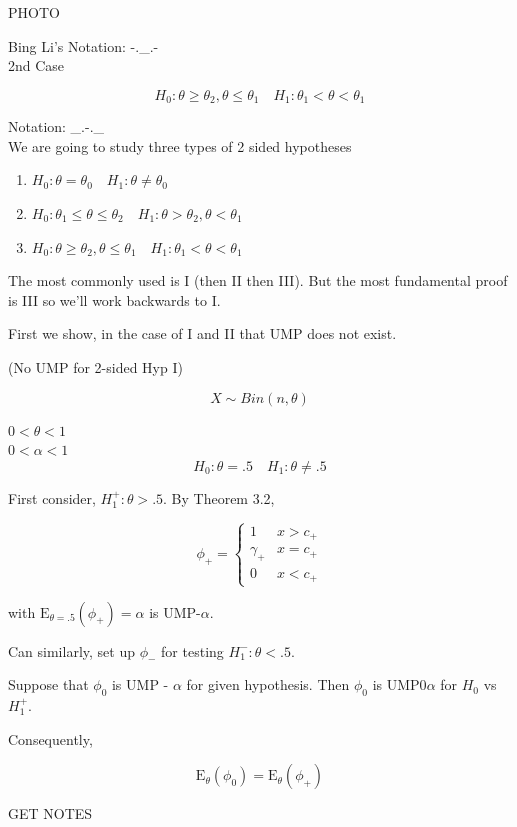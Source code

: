 \documentclass[11pt,fleqn]{book} %
\newcommand{\E}{\mathrm{E}}
\begin{document}
PHOTO

Bing Li's Notation: -.\_.-\\


2nd Case

    	$$ H_0: \theta \geq \theta_2, \theta \leq \theta_1 \quad H_1: \theta_1 < \theta < \theta_1$$

Notation: \_.-.\_ \\



We are going to study three types of 2 sided hypotheses

		\begin{enumerate}[label = \Roman*]
			\item $H_0: \theta = \theta_0 \quad H_1: \theta \neq \theta_0$
			\item $H_0: \theta_1 \leq \theta \leq \theta_2 \quad H_1: \theta > \theta_2, \theta < \theta_1 $
			\item $ H_0: \theta \geq \theta_2, \theta \leq \theta_1 \quad H_1: \theta_1 < \theta < \theta_1$
		\end{enumerate}

The most commonly used is I (then II then III). But the most fundamental proof is III so we'll work backwards to I. 

First we show, in the case of I and II that UMP does not exist. 

\begin{example}
	(No UMP for 2-sided Hyp I)

		$$X \sim Bin(n, \theta) $$

$0 < \theta < 1$\\
$0< \alpha< 1$\\

		$$H_0: \theta = .5 \quad H_1: \theta \neq .5 $$

	First consider, $H_1^+: \theta > .5$. By Theorem 3.2, 

			$$\phi_+ = \left\{ \begin{array}{ll}
				1 & x > c_+\\
				\gamma_+ & x = c_+\\
				0 & x < c_+

			\end{array}\right. $$

with $\E_{\theta = .5} (\phi_+) = \alpha$ is UMP-$\alpha$. 


Can similarly, set up $\phi_-$ for testing $H_1^-: \theta < .5$. 

Suppose that $\phi_0$ is UMP - $\alpha$ for given hypothesis. Then $\phi_0$ is UMP0$\alpha$ for $H_0$ vs $H_1^+$. 


Consequently, 

		$$\E_\theta(\phi_0) = \E_\theta(\phi_+) $$

GET NOTES

\end{example}
\end{document}
